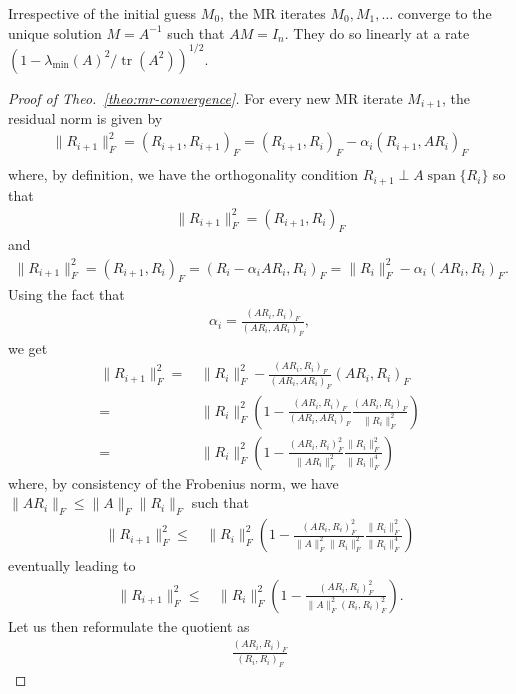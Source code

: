 \documentclass[10pt,a4paper]{amsart}
\begin{document}
\begin{theorem}\label{theo:mr-convergence}
Irrespective of the initial guess $M_0$, the MR iterates $M_0,M_1,\dots$ converge to the unique solution $M=A^{-1}$ such that $AM=I_n$.
They do so linearly at a rate $(1-\lambda_{\min}(A)^2/\operatorname{tr}(A^2))^{1/2}$.
\end{theorem}

\begin{proof}[Proof of Theo.~\ref{theo:mr-convergence}]
For every new MR iterate $M_{i+1}$, the residual norm is given by
\begin{align*}
\|R_{i+1}\|_F^2
=(R_{i+1},R_{i+1})_F
=(R_{i+1},R_i)_F-\alpha_i(R_{i+1},AR_i)_F\\
\end{align*}
where, by definition, we have the orthogonality condition $R_{i+1}\perp A\operatorname{span}\{R_i\}$ so that
\begin{align*}
\|R_{i+1}\|_F^2
=(R_{i+1},R_i)_F
\end{align*}
and
\begin{align}
\|R_{i+1}\|_F^2
=(R_{i+1},R_i)_F
=(R_i-\alpha_i AR_i,R_i)_F
=\|R_i\|_F^2-\alpha_i(AR_i,R_i)_F.
\end{align}
Using the fact that 
\begin{align}
\alpha_i=\frac{(AR_i,R_i)_F}{(AR_i,AR_i)_F},
\end{align}
we get
\begin{align}
\|R_{i+1}\|_F^2
=&\,\|R_i\|_F^2-\frac{(AR_i,R_i)_F}{(AR_i,AR_i)_F}(AR_i,R_i)_F\\
=&\,\|R_i\|_F^2\left(1-\frac{(AR_i,R_i)_F}{(AR_i,AR_i)_F}\frac{(AR_i,R_i)_F}{\|R_i\|_F^2}\right)\\
=&\,\|R_i\|_F^2\left(1-\frac{(AR_i,R_i)_F^2}{\|AR_i\|_F^2}\frac{\|R_i\|_F^2}{\|R_i\|_F^4}\right)
\end{align}
where, by consistency of the Frobenius norm, we have $\|AR_i\|_F\leq\|A\|_F\|R_i\|_F$ such that 
\begin{align}
\|R_{i+1}\|_F^2
\leq&\,\|R_i\|_F^2\left(1-\frac{(AR_i,R_i)_F^2}{\|A\|_F^2\|R_i\|_F^2}\frac{\|R_i\|_F^2}{\|R_i\|_F^4}\right)
\end{align}
eventually leading to
\begin{align}\label{eq:1000}
\|R_{i+1}\|_F^2
\leq&\,\|R_i\|_F^2\left(1-\frac{(AR_i,R_i)_F^2}{\|A\|_F^2(R_i,R_i)_F^2}\right).
\end{align}
Let us then reformulate the quotient as
\begin{align}
\frac{(AR_i,R_i)_F}{(R_i,R_i)_F}

\end{align}
\end{proof}
\end{document}
